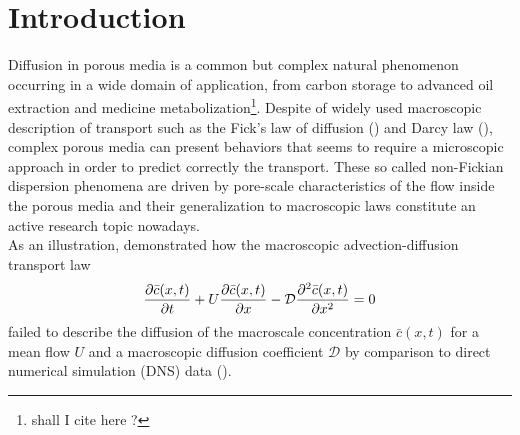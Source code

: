 \chapter{Introduction}
Diffusion in porous media is a common but complex natural phenomenon occurring in a wide domain of application, from carbon storage to advanced oil extraction and medicine metabolization\footnote{shall I cite here ?}.
Despite of widely used macroscopic description of transport such as the Fick's law of diffusion (\citet{Fick1855}) and Darcy law (\citet{Darcy1856}), complex porous media can present behaviors that seems to require a microscopic approach in order to predict correctly the transport.
These so called non-Fickian dispersion phenomena are driven by pore-scale characteristics of the flow inside the porous media and their generalization to macroscopic laws constitute an active research topic nowadays. \\
As an illustration, \citet{Dentz2017} demonstrated how the macroscopic advection-diffusion transport law
\begin{equation}
	\pdv{\bar{c}(x,t)}{t}+U\pdv{\bar{c}(x,t)}{x}-\mathcal{D}\pdv[2]{\bar{c}(x,t)}{x}=0
\label{eq:adv_diff}
\end{equation}
failed to describe the diffusion of the macroscale concentration $\bar{c}(x,t)$ for a mean flow $U$ and a macroscopic diffusion coefficient $\mathcal{D}$ by comparison to direct numerical simulation (DNS) data (\citet[Fig. 3]{Dentz2017}).\\


